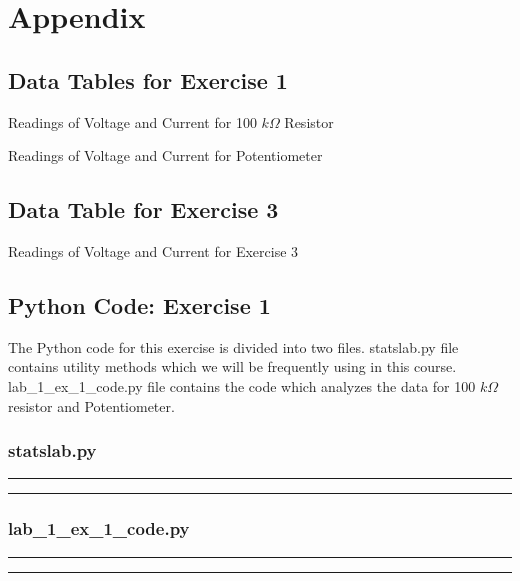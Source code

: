 \documentclass[letterpaper,12pt]{article}
\begin{document}
\pagebreak

\appendix

\section{Appendix}

\subsection{Data Tables for Exercise 1}
\begin{table}[H]
  \centering
  \caption{Readings of Voltage and Current for 100 $k\Omega$ Resistor}
  \label{100kdata}
\end{table}

\begin{table}[H]
  \centering
  \caption{Readings of Voltage and Current for Potentiometer}
  \label{potentiometerdata}
\end{table}

\subsection{Data Table for Exercise 3}
\begin{table}[H]
  \centering
  \caption{Readings of Voltage and Current for Exercise 3}
  \label{ex3data}
\end{table}

\pagebreak

\subsection{Python Code: Exercise 1}

The Python code for this exercise is divided into two files. statslab.py file contains utility methods
which we will be frequently using in this course. lab\_1\_ex\_1\_code.py file contains the code which analyzes
the data for 100 $k\Omega$ resistor and Potentiometer.

\subsubsection{statslab.py}
\noindent\rule{\textwidth}{1pt}

\noindent\rule{\textwidth}{1pt}

\pagebreak

\subsubsection{lab\_1\_ex\_1\_code.py}
\noindent\rule{\textwidth}{1pt}

\noindent\rule{\textwidth}{1pt}
\end{document}
